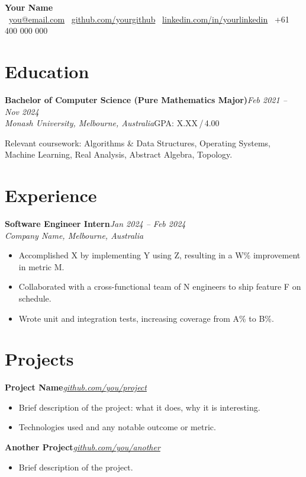 \documentclass[11pt,a4paper]{article}
\newcommand{\resumeheader}[5]{%
  \begin{center}
    {\Huge\bfseries #1}\\[5pt]
    \faEnvelope[regular]\ \href{mailto:#2}{#2}
    \quad\textbar\quad
    \faGithub\ \href{https://github.com/#3}{github.com/#3}
    \quad\textbar\quad
    \faLinkedin\ \href{https://linkedin.com/in/#4}{linkedin.com/in/#4}
    \quad\textbar\quad
    \faPhone\ #5
  \end{center}%
}
\newcommand{\entry}[4]{%
  \noindent\textbf{#1}\hfill\textit{#2}\\
  \textit{#3}\hfill#4\par\vspace{2pt}%
}
\begin{document}
\resumeheader
  {Your Name}
  {you@email.com}
  {yourgithub}
  {yourlinkedin}
  {+61 400 000 000}

\section{Education}

\entry{Bachelor of Computer Science (Pure Mathematics Major)}{Feb 2021 -- Nov 2024}
     {Monash University, Melbourne, Australia}{GPA: X.XX\,/\,4.00}
Relevant coursework: Algorithms \& Data Structures, Operating Systems, Machine Learning,
Real Analysis, Abstract Algebra, Topology.

\section{Experience}

\entry{Software Engineer Intern}{Jan 2024 -- Feb 2024}
     {Company Name, Melbourne, Australia}{}
\begin{itemize}
  \item Accomplished X by implementing Y using Z, resulting in a W\% improvement in metric M.
  \item Collaborated with a cross-functional team of N engineers to ship feature F on schedule.
  \item Wrote unit and integration tests, increasing coverage from A\% to B\%.
\end{itemize}

\section{Projects}

\entry{Project Name}{\href{https://github.com/you/project}{github.com/you/project}}{}{}
\begin{itemize}
  \item Brief description of the project: what it does, why it is interesting.
  \item Technologies used and any notable outcome or metric.
\end{itemize}

\entry{Another Project}{\href{https://github.com/you/another}{github.com/you/another}}{}{}
\begin{itemize}
  \item Brief description of the project.
\end{itemize}
\end{document}
